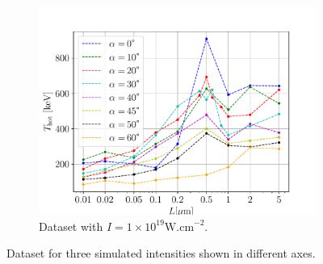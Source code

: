 \begin{figure}[t]
\begin{subfigure}{0.59\textwidth}
		\centering
		\includegraphics[width=\textwidth]{figures/t_hot_l_19}
		\caption{Dataset with $I = 1 \times 10^{19} \mathrm{W.cm}^{-2}$.}
		\label{fig:dataset3-c}
	\end{subfigure}
	\caption{Dataset for three simulated intensities shown in different axes.}
	\label{fig:dataset3}
\end{figure}

